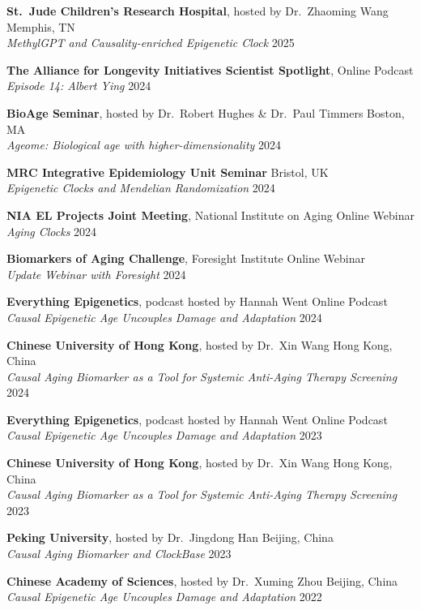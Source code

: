 \documentclass[
  11pt,
]
{article}
\begin{document}
\textbf{St.~Jude Children's Research Hospital}, hosted by Dr.~Zhaoming
Wang \hfill Memphis, TN\\
\emph{MethylGPT and Causality-enriched Epigenetic Clock} \hfill 2025

\textbf{The Alliance for Longevity Initiatives Scientist Spotlight},
\hfill Online Podcast\\
\emph{Episode 14: Albert Ying} \hfill 2024

\textbf{BioAge Seminar}, hosted by Dr.~Robert Hughes \& Dr.~Paul Timmers
\hfill Boston, MA\\
\emph{Ageome: Biological age with higher-dimensionality} \hfill 2024

\textbf{MRC Integrative Epidemiology Unit Seminar} \hfill Bristol, UK\\
\emph{Epigenetic Clocks and Mendelian Randomization} \hfill 2024

\textbf{NIA EL Projects Joint Meeting}, National Institute on Aging
\hfill Online Webinar\\
\emph{Aging Clocks} \hfill 2024

\textbf{Biomarkers of Aging Challenge}, Foresight Institute
\hfill Online Webinar\\
\emph{Update Webinar with Foresight} \hfill 2024

\textbf{Everything Epigenetics}, podcast hosted by Hannah Went
\hfill Online Podcast\\
\emph{Causal Epigenetic Age Uncouples Damage and Adaptation} \hfill 2024

\textbf{Chinese University of Hong Kong}, hosted by Dr.~Xin Wang
\hfill Hong Kong, China\\
\emph{Causal Aging Biomarker as a Tool for Systemic Anti-Aging Therapy
Screening} \hfill 2024

\textbf{Everything Epigenetics}, podcast hosted by Hannah Went
\hfill Online Podcast\\
\emph{Causal Epigenetic Age Uncouples Damage and Adaptation} \hfill 2023

\textbf{Chinese University of Hong Kong}, hosted by Dr.~Xin Wang
\hfill Hong Kong, China\\
\emph{Causal Aging Biomarker as a Tool for Systemic Anti-Aging Therapy
Screening} \hfill 2023

\textbf{Peking University}, hosted by Dr.~Jingdong Han \hfill Beijing,
China\\
\emph{Causal Aging Biomarker and ClockBase} \hfill 2023

\textbf{Chinese Academy of Sciences}, hosted by Dr.~Xuming Zhou
\hfill Beijing, China\\
\emph{Causal Epigenetic Age Uncouples Damage and Adaptation} \hfill 2022
\end{document}
